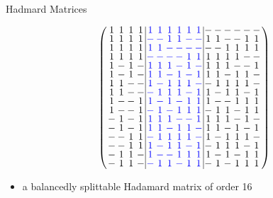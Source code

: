 \documentclass{beamer}
\newcommand{\bblue}[1]{\textcolor{blue}{#1}}
\begin{document}
\begin{frame}{Hadmard Matrices}

  \[
    \arraycolsep=1.0pt\def\arraystretch{0.75}
    \left(\begin{array}{cccc|cccccc|cccccc}
            1&1&1&1&\bblue{1}&\bblue{1}&\bblue{1}&\bblue{1}&\bblue{1}&\bblue{1}&-&-&-&-&-&-\\
            1&1&1&1&\bblue{-}&\bblue{-}&\bblue{1}&\bblue{1}&\bblue{-}&\bblue{-}&1&1&-&-&1&1\\
            1&1&1&1&\bblue{1}&\bblue{1}&\bblue{-}&\bblue{-}&\bblue{-}&\bblue{-}&-&-&1&1&1&1\\
            1&1&1&1&\bblue{-}&\bblue{-}&\bblue{-}&\bblue{-}&\bblue{1}&\bblue{1}&1&1&1&1&-&-\\
            1&-&1&-&\bblue{1}&\bblue{1}&\bblue{1}&\bblue{-}&\bblue{1}&\bblue{-}&1&1&1&-&-&1\\
            1&-&1&-&\bblue{1}&\bblue{1}&\bblue{-}&\bblue{1}&\bblue{-}&\bblue{1}&1&1&-&1&1&-\\
            1&1&-&-&\bblue{1}&\bblue{-}&\bblue{1}&\bblue{1}&\bblue{1}&\bblue{-}&-&1&1&1&1&-\\
            1&1&-&-&\bblue{-}&\bblue{1}&\bblue{1}&\bblue{1}&\bblue{-}&\bblue{1}&1&-&1&1&-&1\\
            1&-&-&1&\bblue{1}&\bblue{-}&\bblue{1}&\bblue{-}&\bblue{1}&\bblue{1}&1&-&-&1&1&1\\
            1&-&-&1&\bblue{-}&\bblue{1}&\bblue{-}&\bblue{1}&\bblue{1}&\bblue{1}&-&1&1&-&1&1\\
            -&1&-&1&\bblue{1}&\bblue{1}&\bblue{1}&\bblue{-}&\bblue{-}&\bblue{1}&1&1&1&-&1&-\\
            -&1&-&1&\bblue{1}&\bblue{1}&\bblue{-}&\bblue{1}&\bblue{1}&\bblue{-}&1&1&-&1&-&1\\
            -&-&1&1&\bblue{-}&\bblue{1}&\bblue{1}&\bblue{1}&\bblue{1}&\bblue{-}&1&-&1&1&1&-\\
            -&-&1&1&\bblue{1}&\bblue{-}&\bblue{1}&\bblue{1}&\bblue{-}&\bblue{1}&-&1&1&1&-&1\\
            -&1&1&-&\bblue{1}&\bblue{-}&\bblue{-}&\bblue{1}&\bblue{1}&\bblue{1}&1&-&1&-&1&1\\
            -&1&1&-&\bblue{-}&\bblue{1}&\bblue{1}&\bblue{-}&\bblue{1}&\bblue{1}&-&1&-&1&1&1\\
          \end{array}\right)
      \]

      \begin{itemize}
      \item a balancedly splittable Hadamard matrix of order 16
      \end{itemize}

\end{frame}
\end{document}
